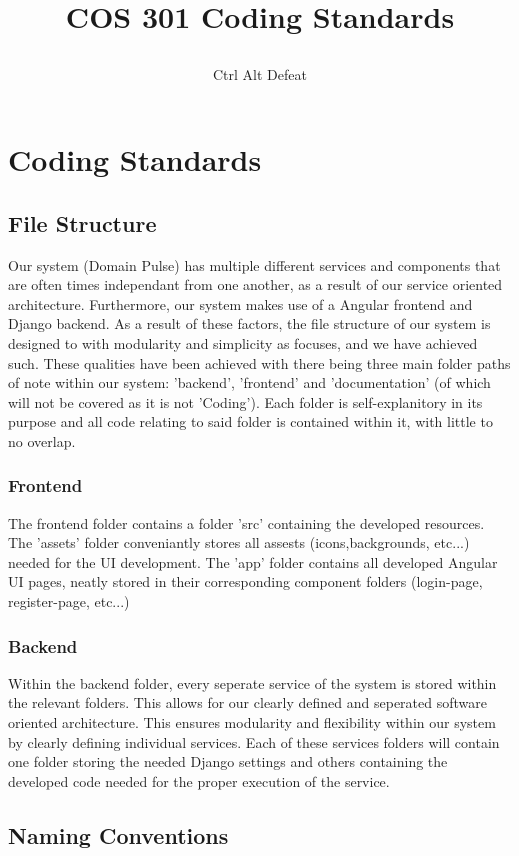 \documentclass[12pt]{article}
\title{

\\
{COS 301 Coding Standards}
}
\author{Ctrl Alt Defeat}
\begin{document}


\tableofcontents

\newpage

\section{Coding Standards}
\subsection{File Structure}
Our system (Domain Pulse) has multiple different services and components that are often times independant from one another, as a result of our service oriented architecture. Furthermore, our system makes use of a Angular frontend and Django backend. As a result of these factors, the file structure of our system is designed to with modularity and simplicity as focuses, and we have achieved such. These qualities have been achieved with there being three main folder paths of note within our system: 'backend', 'frontend' and 'documentation' (of which will not be covered as it is not 'Coding'). Each folder is self-explanitory in its purpose and all code relating to said folder is contained within it, with little to no overlap.
\subsubsection{Frontend}
The frontend folder contains a folder 'src' containing the developed resources. The 'assets' folder conveniantly stores all assests (icons,backgrounds, etc...) needed for the UI development. The 'app' folder contains all developed Angular UI pages, neatly stored in their corresponding component folders (login-page, register-page, etc...)
\subsubsection{Backend}
Within the backend folder, every seperate service of the system is stored within the relevant folders. This allows for our clearly defined and seperated software oriented architecture. This ensures modularity and flexibility within our system by clearly defining individual services. Each of these services folders will contain one folder storing the needed Django settings and others containing the developed code needed for the proper execution of the service.

\subsection{Naming Conventions}
\end{document}
